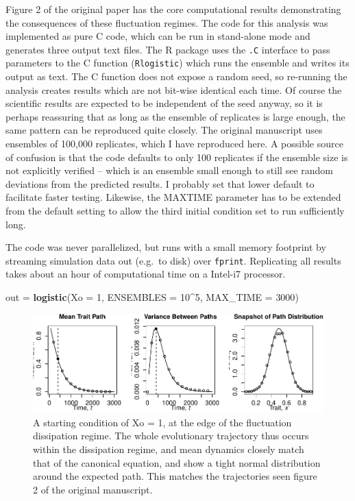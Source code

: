 \documentclass[
]{rescience}
\newenvironment{Shaded}{\begin{snugshade}}{\end{snugshade}}
\newcommand{\DataTypeTok}[1]{\textcolor[rgb]{0.13,0.29,0.53}{#1}}
\newcommand{\DecValTok}[1]{\textcolor[rgb]{0.00,0.00,0.81}{#1}}
\newcommand{\KeywordTok}[1]{\textcolor[rgb]{0.13,0.29,0.53}{\textbf{#1}}}
\newcommand{\NormalTok}[1]{#1}
\newcommand{\OperatorTok}[1]{\textcolor[rgb]{0.81,0.36,0.00}{\textbf{#1}}}
\newcommand{\StringTok}[1]{\textcolor[rgb]{0.31,0.60,0.02}{#1}}
\begin{document}
Figure 2 of the original paper has the core computational results
demonstrating the consequences of these fluctuation regimes. The code
for this analysis was implemented as pure C code, which can be run in
stand-alone mode and generates three output text files. The R package
uses the \texttt{.C} interface to pass parameters to the C function
(\texttt{Rlogistic}) which runs the ensemble and writes its output as
text. The C function does not expose a random seed, so re-running the
analysis creates results which are not bit-wise identical each time. Of
course the scientific results are expected to be independent of the seed
anyway, so it is perhaps reassuring that as long as the ensemble of
replicates is large enough, the same pattern can be reproduced quite
closely. The original manuscript uses ensembles of 100,000 replicates,
which I have reproduced here. A possible source of confusion is that the
code defaults to only 100 replicates if the ensemble size is not
explicitly verified -- which is an ensemble small enough to still see
random deviations from the predicted results. I probably set that lower
default to facilitate faster testing. Likewise, the MAXTIME parameter
has to be extended from the default setting to allow the third initial
condition set to run sufficiently long.

The code was never parallelized, but runs with a small memory footprint
by streaming simulation data out (e.g.~to disk) over \texttt{fprint}.
Replicating all results takes about an hour of computational time on a
Intel-i7 processor.

\begin{Shaded}
\begin{Highlighting}[]
\NormalTok{out =}\StringTok{ }\KeywordTok{logistic}\NormalTok{(}\DataTypeTok{Xo =} \DecValTok{1}\NormalTok{,  }\DataTypeTok{ENSEMBLES =} \DecValTok{10}\OperatorTok{^}\DecValTok{5}\NormalTok{, }\DataTypeTok{MAX_TIME =} \DecValTok{3000}\NormalTok{)}
\end{Highlighting}
\end{Shaded}

\begin{figure}
\centering
\includegraphics{article_files/figure-latex/unnamed-chunk-2-1.pdf}
\caption{A starting condition of Xo = 1, at the edge of the fluctuation
dissipation regime. The whole evolutionary trajectory thus occurs within
the dissipation regime, and mean dynamics closely match that of the
canonical equation, and show a tight normal distribution around the
expected path. This matches the trajectories seen figure 2 of the
original manuscript.}
\end{figure}
\end{document}
